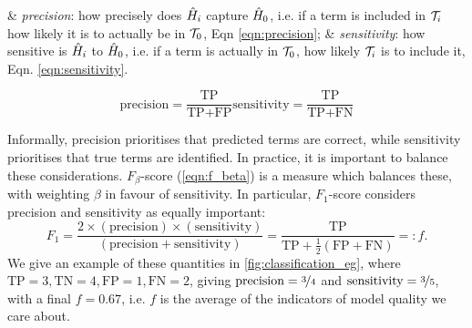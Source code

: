\begin{easylist}
    & \emph{precision}: how precisely does $\hat{H}_i$ capture $\hat{H}_0$,
    i.e. if a term is included in ${ \mathcal{T}_i }$ how likely it is to actually be in ${ \mathcal{T}_0 }$, Eqn \ref{eqn:precision};
    & \emph{sensitivity}: how sensitive is $\hat{H}_i$ to $\hat{H}_0$, 
    i.e. if a term is actually in ${ \mathcal{T}_0 }$, how likely ${ \mathcal{T}_i }$ is to include it, Eqn. \ref{eqn:sensitivity}.
\end{easylist}

\begin{subequations}
    \begin{equation}
        \label{eqn:precision}
        \text{precision} = \frac{\textrm{TP}}{\textrm{TP} + \textrm{FP}}
    \end{equation}
       
    \begin{equation}
        \label{eqn:sensitivity}
        \text{sensitivity} = \frac{\textrm{TP}}{\textrm{TP} + \textrm{FN}}
    \end{equation}
\end{subequations}

Informally, precision prioritises that predicted terms are correct, 
    while sensitivity prioritises that true terms are identified. 
In practice, it is important to balance these considerations. 
$F_{\beta}$-score (\cref{eqn:f_beta}) is a measure which balances these,
    with weighting $\beta$ in favour of sensitivity.
In particular, $F_1$-score considers precision and sensitivity as equally important:
\begin{equation}
    \label{eqn:f1_score}
    F_1 = \frac{
        2\times (\textrm{precision})\times(\textrm{sensitivity})
    }{
        (\textrm{precision} + \textrm{sensitivity})
    } = \frac{\textrm{TP}}{\textrm{TP} + \frac{1}{2}(\textrm{FP} + \textrm{FN})} =: f.
\end{equation}
We give an example of these quantities in \cref{fig:classification_eg}, 
    where $\textrm{TP}=3, \textrm{TN}=4, \textrm{FP}=1, \textrm{FN}=2$, giving $\textrm{precision} = \nicefrac{3}{4}$ 
    and $\textrm{sensitivity} = \nicefrac{3}{5}$, 
    with a final $f = 0.67$, i.e. $f$ is the average of the indicators of model quality we care about. 
\par 

